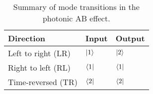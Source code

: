 \begin{table}[b]
	\centering
	\begin{tabular}{|l|l|l|}
		\hline
		Direction & Input         & Output         \\
		\hline
		Left to right (LR) & $\ket{1}$  & $\ket{2}$  \\
		Right to left (RL) & $\bra{1}$ & $\bra{1}$ \\
		Time-reversed (TR) & $\bra{2}$ & $\bra{2}$ \\
		\hline
	\end{tabular}
	\caption[Summary of mode transitions in the photonic AB effect.]{Summary of mode transitions in the photonic AB effect.}
	\label{tab:modess}
\end{table}

 